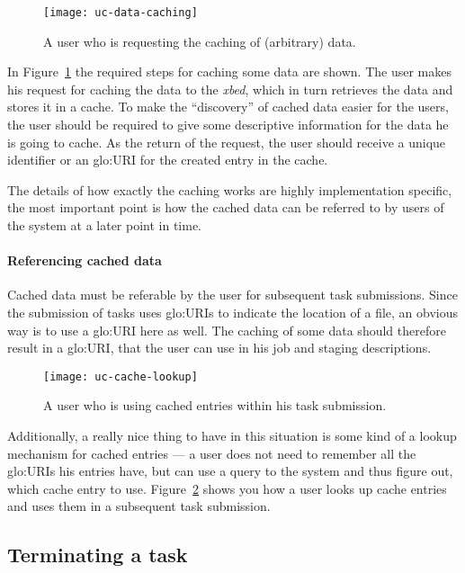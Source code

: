 \begin{figure}[h]
  \centering
  \texttt{[image: uc-data-caching]}
  \caption[UC  Data  Caching]{A user  who  is  requesting  the caching  of
    (arbitrary) data.}
  \label{fig:uc-data-caching}
\end{figure}

In  Figure~\ref{fig:uc-data-caching} the required  steps for  caching some
data are  shown. The user  makes his request  for caching the data  to the
\emph{xbed}, which in turn retrieves the data and stores it in a cache. To
make  the ``discovery''  of cached  data easier  for the  users,  the user
should be required to give some descriptive information for the data he is
going to  cache. As the return of  the request, the user  should receive a
unique identifier or an \gls{glo:URI} for the created entry in the cache.

The details  of how  exactly the caching  works are  highly implementation
specific, the most important point is  how the cached data can be referred
to by users of the system at a later point in time.

\paragraph{Referencing cached  data}

Cached data must be referable by the user for subsequent task submissions.
Since the submission of tasks uses \gls{glo:URI}s to indicate the location
of a  file, an obvious  way is  to use a  \gls{glo:URI} here as  well. The
caching of some data should  therefore result in a \gls{glo:URI}, that the
user can use in his job and staging descriptions.

\begin{figure}[h]
  \centering
  \texttt{[image: uc-cache-lookup]}
  \caption[UC  Cache Lookup]{A user  who  is using cached entries within
    his task submission.}
  \label{fig:uc-cache-lookup}
\end{figure}

Additionally, a really  nice thing to have in this  situation is some kind
of a lookup mechanism for cached  entries --- \ie a user does not need to
remember all the  \gls{glo:URI}s his entries have, but can  use a query to
the    system   and   thus    figure   out,    which   cache    entry   to
use. Figure~\ref{fig:uc-cache-lookup} shows you  how a user looks up cache
entries and uses them in a subsequent task submission.

\subsection{Terminating a task}
\label{sec:uc-terminate-task}

